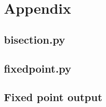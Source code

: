 \documentclass{article}
\begin{document}
\pagebreak

\section{Appendix}

\subsection{bisection.py}
\label{sec:bisection}


\pagebreak

\subsection{fixedpoint.py}
\label{sec:fixedpoint}


\pagebreak

\subsection{Fixed point output}
\label{sec:fpoutput}

\end{document}
